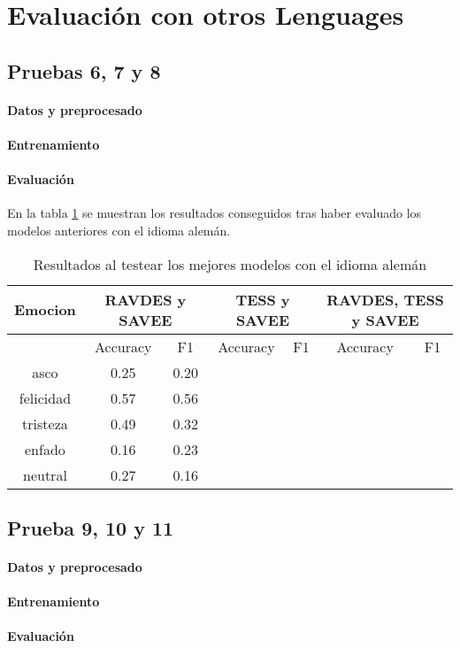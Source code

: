 \documentclass[11pt,a4paper,spanish]{book}
\begin{document}
	\section{Evaluación con otros Lenguages}
	
	\subsection{Pruebas 6, 7 y 8}
	\paragraph{Datos y preprocesado}
	\paragraph{Entrenamiento}
	\paragraph{Evaluación}
	En la tabla \ref{results_TestGerman} se muestran los resultados conseguidos tras haber evaluado los modelos anteriores con el idioma alemán.
	\begin{table}[H]
		\centering
		\begin{center}
			\begin{tabular}{| c|| c c |  c c |  c c | }
				\hline
				\multicolumn{1}{|c||}{Emocion} & 
				\multicolumn{2}{|c|}{RAVDES y SAVEE}&
				\multicolumn{2}{|c|}{TESS y SAVEE} &
				\multicolumn{2}{|c|}{RAVDES, TESS y SAVEE} \\
				
				\hline
				& 
				\multicolumn{1}{|c|}{Accuracy}&\multicolumn{1}{|c|}{F1}&
				\multicolumn{1}{|c|}{Accuracy}&\multicolumn{1}{|c|}{F1}&
				\multicolumn{1}{|c|}{Accuracy}&\multicolumn{1}{|c|}{F1}\\
				\hline
				
				asco 		& 0.25 & 0.20 &  &  &  & \\
				felicidad 	& 0.57 & 0.56 &  &  &  & \\
				tristeza 	& 0.49 & 0.32 &  &  &  & \\
				enfado 		& 0.16 & 0.23 &  &  &  & \\
				neutral 	& 0.27 & 0.16 &  &  &  & \\
				\hline
			\end{tabular}
			
			\caption{Resultados al testear los mejores modelos con el idioma alemán}
			\label{results_TestGerman}
		\end{center}
	\end{table}
	
	\subsection{Prueba 9, 10 y 11}
	\paragraph{Datos y preprocesado}
	\paragraph{Entrenamiento}
	\paragraph{Evaluación}

		
		
		
		
		
		
		

	\printbibliography
	
\end{document}
